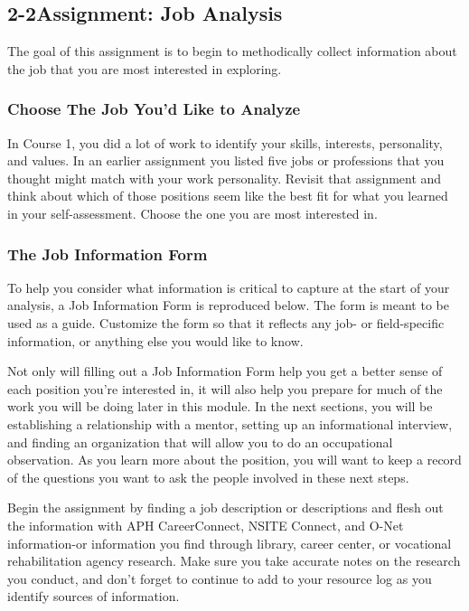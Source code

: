 \pagebreak \subsection*{2-2\quad Assignment: Job Analysis}
The goal of this assignment is to begin to methodically collect information about the job that you are most interested in exploring.

\subsubsection*{Choose The Job You'd Like to Analyze}
In Course 1, you did a lot of work to identify your skills, interests, personality, and values. In an earlier assignment you listed five jobs or professions that you thought might match with your work personality.
Revisit that assignment and think about which of those positions seem like the best fit for what you learned in your self-assessment. Choose the one you are most interested in.
\subsubsection*{The Job Information Form}
To help you consider what information is critical to capture at the start of your analysis, a Job Information Form is reproduced below. The form is meant to be used as a guide. Customize the form so that it reflects any job- or field-specific information, or anything else you would like to know.

Not only will filling out a Job Information Form help you get a better sense of each position you're interested in, it will also help you prepare for much of the work you will be doing later in this module. In the next sections, you will be establishing a relationship with a mentor, setting up an informational interview, and finding an organization that will allow you to do an occupational observation. As you learn more about the position, you will want to keep a record of the questions you want to ask the people involved in these next steps.

Begin the assignment by finding a job description or descriptions and flesh out the information with APH CareerConnect, NSITE Connect, and O-Net information-or information you find through library, career center, or vocational rehabilitation agency research. Make sure you take accurate notes on the research you conduct, and don't forget to continue to add to your resource log as you identify sources of information.

